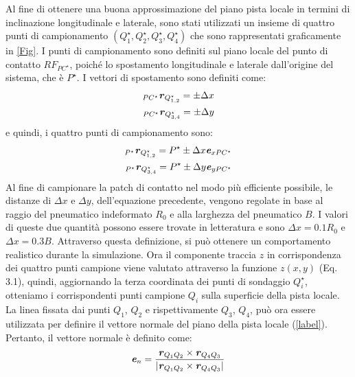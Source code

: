 %
Al fine di ottenere una buona approssimazione del piano pista locale in termini di inclinazione longitudinale e laterale, sono stati utilizzati un insieme di quattro punti di campionamento $(Q^\star_1, Q^\star_2, Q^\star_3, Q^\star_4)$ che sono rappresentati graficamente in \figurename\ref{Fig}. I punti di campionamento sono definiti sul piano locale del punto di contatto $RF_{PC^\star}$, poiché lo spostamento longitudinale e laterale dall'origine del sistema, che è $P^\star$. I vettori di spostamento sono definiti come:
%
\begin{equation}
\begin{split}
_{PC^\star}\textbf{\textit{r}}_{Q^\star_{1,2}} = \pm \Delta x \\
_{PC^\star}\textbf{\textit{r}}_{Q^\star_{3,4}} = \pm \Delta y
\end{split}
\end{equation}
%
e quindi, i quattro punti di campionamento sono:
%
\begin{equation}
\begin{split}
_{P^\star}\textbf{\textit{r}}_{Q^\star_{1,2}} = P^\star \pm \Delta x \textbf{\textit{e}}_{xPC^\star} \\
_{P^\star}\textbf{\textit{r}}_{Q^\star_{3,4}} = P^\star \pm \Delta y \textbf{\textit{e}}_{yPC^\star}
\end{split}
\end{equation}
%
Al fine di campionare la patch di contatto nel modo più efficiente possibile, le distanze di $\Delta x$ e $\Delta y$, dell'equazione precedente, vengono regolate in base al raggio del pneumatico indeformato $R_0$ e alla larghezza del pneumatico $B$. I valori di queste due quantità possono essere trovate in letteratura e sono $\Delta x = 0.1 R_0$ e $\Delta x = 0.3 B$. Attraverso questa definizione, si può ottenere un comportamento realistico durante la simulazione.
%
%
Ora il componente traccia $z$ in corrispondenza dei quattro punti campione viene valutato attraverso la funzione $z(x,y)$ (Eq. 3.1), quindi, aggiornando la terza coordinata dei punti di sondaggio $Q^\star_i$, otteniamo i corrispondenti punti campione $Q_i$ sulla superficie della pista locale. La linea fissata dai punti $Q_1$, $Q_2$ e rispettivamente $Q_3$, $Q_4$, può ora essere utilizzata per definire il vettore normale del piano della pista locale (\figurename\ref{label}). Pertanto, il vettore normale è definito come:
%
\begin{equation}
\textbf{\textit{e}}_n = \frac{\textbf{\textit{r}}_{Q_1 Q_2} \times \textbf{\textit{r}}_{Q_4 Q_3}}{|\textbf{\textit{r}}_{Q_1 Q_2} \times \textbf{\textit{r}}_{Q_4 Q_3}|}
\end{equation}
